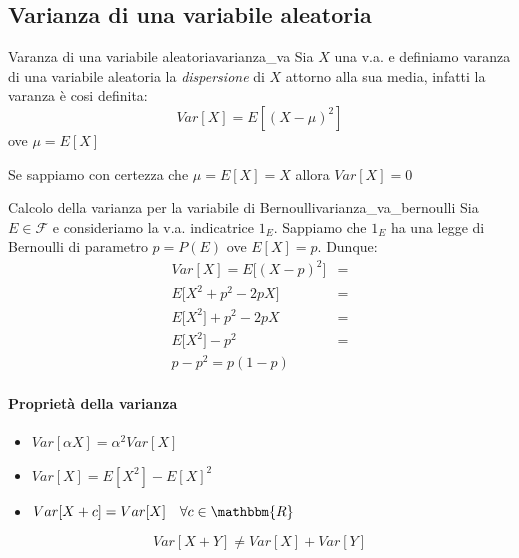\documentclass[12pt]{report}
\newcounter{definition}
\newcommand{\nmu}{}
\begin{document}
 	\subsection{Varianza di una variabile aleatoria}
 	\begin{definition}{\nmu Varanza di una variabile aleatoria}{varianza_va}
 		Sia $X$ una v.a. e definiamo varanza di una variabile aleatoria la \textit{dispersione} di $X$ attorno alla sua media, infatti la varanza è cosi definita:
 		\[
 		Var[X] = E[(X - \mu)^2]
 		\]
 		ove $\mu = E[X]$
 	\end{definition}
	Se sappiamo con certezza che $\mu = E[X] = X$ allora $Var[X] = 0$
 	\begin{example}{\nmu Calcolo della varianza per la variabile di Bernoulli}{varianza_va_bernoulli}
 		Sia $E \in \mathcal{F}$ e consideriamo la v.a. indicatrice $1_E$. Sappiamo che $1_E$ ha una legge di Bernoulli di parametro $p = P(E)$ ove $E[X] = p$. Dunque:
 		\begin{align*}
 			Var[X] = E\bigl[(X - p)^2\bigr] &= \\ E\bigl[X^2 + p^2 - 2pX\bigr]  &= \\  E\bigl[X^2\bigr] + p^2 - 2pX &=  \\ E\bigl[X^2\bigr] - p^2 &= \\ p - p^2 = p(1-p)
 		\end{align*}
 	\end{example}
 	\paragraph{Proprietà della varianza}
 	\begin{itemize}
 		\item $Var[\alpha X] = \alpha^2Var[X]$
 		\item $Var[X] = E[X^2] - E[X]^2$
 		\item $Var[X + c]= Var[X] \quad \forall c \in \mathbbm{R}$
 	\end{itemize}
 	\begin{note}{}{}
 		\[
 		Var[X + Y] \neq Var[X] + Var[Y]
 		\]
 	\end{note}
\end{document}
